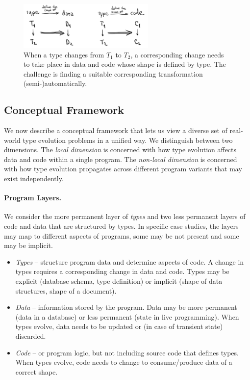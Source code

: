 \documentclass[english,submission]{programming}
\begin{document}
\begin{figure}[t]
\centering
\includegraphics[width=0.6\textwidth]{figures/arrows.png}
\caption{When a type changes from $T_1$ to $T_2$, a corresponding change needs to take place
  in data and code whose shape is defined by type. The challenge is finding a suitable
  corresponding transformation (semi-)automatically.}
\label{fig:change}
\end{figure}

\subsection{Conceptual Framework}

We now describe a conceptual framework that lets us view a diverse set of real-world
type evolution problems in a unified way. We distinguish between two dimensions.
The \emph{local dimension} is concerned with how type evolution affects data and code within
a single program. The \emph{non-local dimension} is concerned with how type evolution
propagates across different program variants that may exist independently.

\paragraph{Program Layers.}
We consider the more permanent layer of \emph{types} and two less permanent layers of code and
data that are structured by types. In specific case studies, the layers may map to
different aspects of programs, some may be not present and some may be implicit.

\begin{itemize}
\item \emph{Types} -- structure program data and determine aspects of code. A change in types
  requires a corresponding change in data and code. Types may be explicit (database schema, type definition)
  or implicit (shape of data structures, shape of a document).
\item \emph{Data} -- information stored by the program. Data may be more permanent (data in a
  database) or less permanent (state in live programming). When types evolve, data needs to be
  updated or (in case of transient state) discarded.
\item \emph{Code} -- or program logic, but not including source code that defines types.
  When types evolve, code needs to change to consume/produce data of a correct shape.
\end{itemize}
\end{document}
